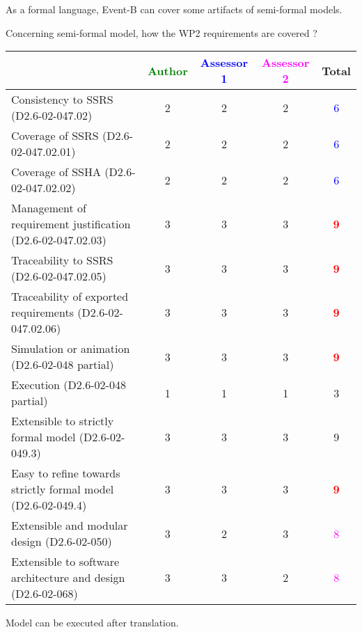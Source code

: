 \begin{author_comment}
As a formal language, Event-B  can cover some artifacts of semi-formal models.
\end{author_comment}

Concerning semi-formal model, how the WP2 requirements are covered ?

\begin{tabular}{|l | c | c | c | c|}
\hline
& \textcolor{green}{Author} & \textcolor{blue}{Assessor 1} & \textcolor{magenta}{Assessor 2} & Total \\
\hline 
Consistency to SSRS (D2.6-02-047.02) & 2     & 2     & 2     & \textcolor{blue}{6} \\
\hline
Coverage of SSRS (D2.6-02-047.02.01)  & 2     & 2     & 2     & \textcolor{blue}{6} \\
\hline
Coverage of SSHA (D2.6-02-047.02.02)  & 2     & 2     & 2     & \textcolor{blue}{6} \\
\hline
Management of requirement justification (D2.6-02-047.02.03)  & 3     & 3     & 3     & \textcolor{red}{\textbf{9}}  \\
\hline
Traceability to  SSRS (D2.6-02-047.02.05)  & 3     & 3     & 3     & \textcolor{red}{\textbf{9}} \\
\hline
Traceability of exported requirements (D2.6-02-047.02.06)  & 3     & 3     & 3     & \textcolor{red}{\textbf{9}} \\
\hline
Simulation or animation (D2.6-02-048 partial)  & 3     & 3     & 3     & \textcolor{red}{\textbf{9}} \\
\hline
Execution (D2.6-02-048 partial)  & 1     & 1     & 1     & 3     \\
\hline
Extensible to strictly formal model (D2.6-02-049.3) & 3     & 3     & 3     &  9 \\
\hline
Easy to  refine towards strictly formal model (D2.6-02-049.4) & 3     & 3     & 3     & \textcolor{red}{\textbf{9}} \\
\hline
Extensible and modular design (D2.6-02-050)  & 3     & 2     & 3     & \textcolor{magenta}{8}  \\
\hline
Extensible to software architecture and design (D2.6-02-068)   & 3     & 3     & 2     & \textcolor{magenta}{8} \\
\hline
\end{tabular}


\begin{author_comment}
Model can be executed after translation.
\end{author_comment}

